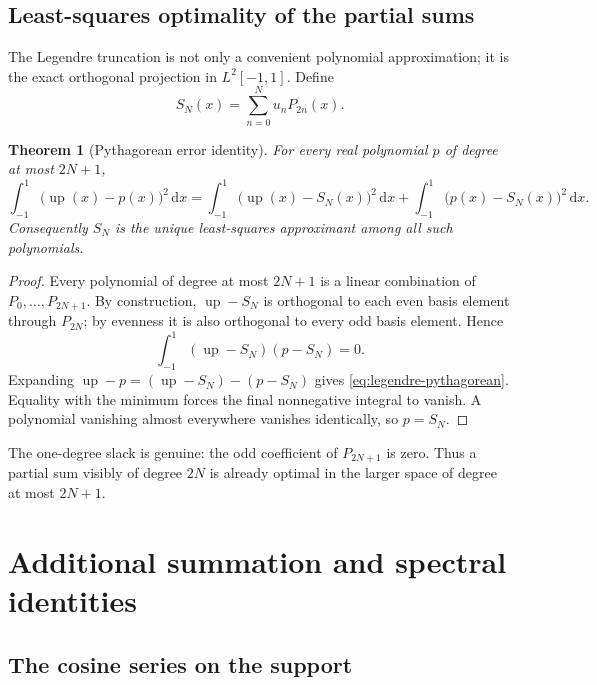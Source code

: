 \documentclass[11pt,oneside]{article}
\newtheorem{theorem}{Theorem}[section]
\theoremstyle{definition}
\theoremstyle{remark}
\newcommand{\Up}{\operatorname{up}}
\newcommand{\dd}{\,\mathrm d}
\begin{document}
\subsection{Least-squares optimality of the partial sums}

The Legendre truncation is not only a convenient polynomial approximation; it is the exact
orthogonal projection in $L^2[-1,1]$.  Define
\begin{equation}
 S_N(x)=\sum_{n=0}^{N}u_nP_{2n}(x).                       \label{eq:legendre-partial-sum}
\end{equation}

\begin{theorem}[Pythagorean error identity]
For every real polynomial $p$ of degree at most $2N+1$,
\begin{equation}
 \int_{-1}^{1}\bigl(\Up(x)-p(x)\bigr)^2\dd x
 =
 \int_{-1}^{1}\bigl(\Up(x)-S_N(x)\bigr)^2\dd x
 +
 \int_{-1}^{1}\bigl(p(x)-S_N(x)\bigr)^2\dd x.             \label{eq:legendre-pythagorean}
\end{equation}
Consequently $S_N$ is the unique least-squares approximant among all such polynomials.
\end{theorem}

\begin{proof}
Every polynomial of degree at most $2N+1$ is a linear combination of
$P_0,\ldots,P_{2N+1}$.  By construction, $\Up-S_N$ is orthogonal to each even basis
element through $P_{2N}$; by evenness it is also orthogonal to every odd basis element.
Hence
\begin{equation*}
 \int_{-1}^{1}(\Up-S_N)(p-S_N)=0.
\end{equation*}
Expanding
$\Up-p=(\Up-S_N)-(p-S_N)$ gives \eqref{eq:legendre-pythagorean}.  Equality with the
minimum forces the final nonnegative integral to vanish.  A polynomial vanishing almost
everywhere vanishes identically, so $p=S_N$.
\end{proof}

The one-degree slack is genuine: the odd coefficient of $P_{2N+1}$ is zero.  Thus a partial
sum visibly of degree $2N$ is already optimal in the larger space of degree at most
$2N+1$.


\section{Additional summation and spectral identities}
\label{sec:additional-identities}

\subsection{The cosine series on the support}
\end{document}
